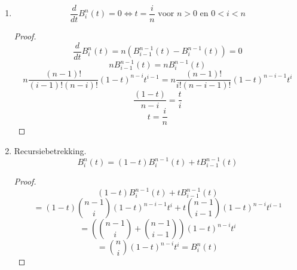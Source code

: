 \documentclass[tmi_notities.tex]{subfiles}
\begin{document}
\begin{enumerate}
\item
\[
\frac{d}{dt}B_{i}^{n}(t) = 0 \Leftrightarrow t = \frac{i}{n} \text{ voor } n > 0 \text{ en } 0 < i < n
\]
\begin{proof}
\[
\frac{d}{dt}B_{i}^{n}(t) = n(B_{i-1}^{n-1}(t) - B_{i}^{n-1}(t)) = 0
\]
\[
nB_{i-1}^{n-1}(t) = nB_{i}^{n-1}(t)
\]
\[
n \frac{(n-1)!}{(i-1)!(n-i)!}
(1-t)^{n-i}t^{i-1}
=
n \frac{(n-1)!}{i!(n-i-1)!}
(1-t)^{n-i-1}t^{i}
\]
\[
\frac{(1-t)}{n-i}
=
\frac{t}{i}
\]
\[
t = \frac{i}{n}
\]
\end{proof}

\item Recursiebetrekking.
\[
B_{i}^{n}(t) = (1-t)B^{n-1}_{i}(t) + tB^{n-1}_{i-1}(t)
\]
\begin{proof}
\[
(1-t)B^{n-1}_{i}(t) + tB^{n-1}_{i-1}(t)
\]
\[
= 
(1-t)\binom{n-1}{i}
(1-t)^{n-i-1}t^{i}
+
t\binom{n-1}{i-1}
(1-t)^{n-i}t^{i-1} 
\]
\[
= \left(\binom{n-1}{i}+\binom{n-1}{i-1}\right)
(1-t)^{n-i}t^{i}
\]
\[
=
\binom{n}{i}
(1-t)^{n-i}t^{i}
= B_{i}^{n}(t)
\]
\end{proof}
\end{enumerate}
\end{document}
